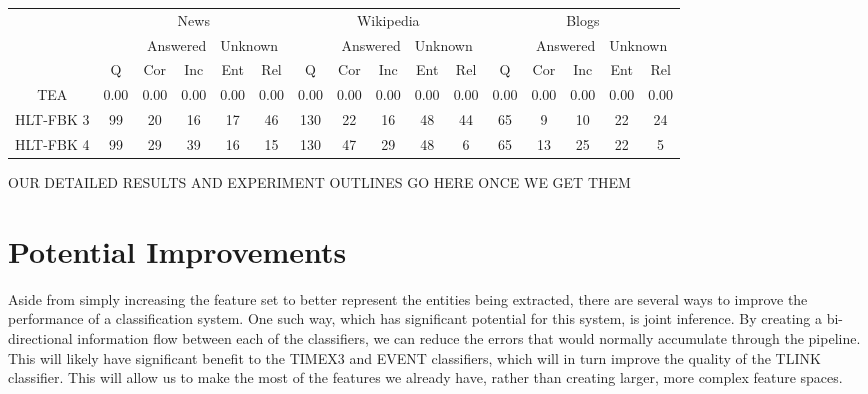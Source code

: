 \documentclass[11pt,letterpaper]{article}
\begin{document}
\begin{center}
	\begin{tabular}{c|ccc|cc|ccc|cc|ccc|cc}
		
	\multirow{2}{*}{} &
		\multicolumn{5}{c}{News} & 
		\multicolumn{5}{|c}{Wikipedia} & 
		\multicolumn{5}{|c}{Blogs} \\
	
	\multirow{2}{*}{} &
		\multicolumn{3}{r}{Answered} &
		\multicolumn{2}{l|}{Unknown} &
		\multicolumn{3}{r}{Answered} &
		\multicolumn{2}{l|}{Unknown} &
		\multicolumn{3}{r}{Answered} &
		\multicolumn{2}{l}{Unknown} \\
		
		& Q & Cor & Inc & Ent & Rel
		& Q & Cor & Inc & Ent & Rel
		& Q & Cor & Inc & Ent & Rel \\
		\hline
	
		TEA & 
		0.00 & 0.00 & 0.00 & 0.00 & 0.00 &
		0.00 & 0.00 & 0.00 & 0.00 & 0.00 & 
		0.00 & 0.00 & 0.00 & 0.00 & 0.00 \\

		HLT-FBK 3 &
		99 & 20 & 16 & 17 & 46 &
		130 & 22 & 16 & 48 & 44 &
		65 & 9 & 10 & 22 & 24 \\

		HLT-FBK 4 &
		99 & 29 & 39 & 16 & 15 &
		130 & 47 & 29 & 48 & 6 &
		65 & 13 & 25 & 22 & 5 \\
		
	\end{tabular}
\end{center}

\vspace{5mm}

OUR DETAILED RESULTS AND EXPERIMENT OUTLINES GO HERE ONCE WE GET THEM


\section{Potential Improvements}

Aside from simply increasing the feature set to better represent the entities being extracted, there are several ways to improve the performance of a classification system. One such way, which has significant potential for this system, is joint inference. By creating a bi-directional information flow between each of the classifiers, we can reduce the errors that would normally accumulate through the pipeline. This will likely have significant benefit to the TIMEX3 and EVENT classifiers, which will in turn improve the quality of the TLINK classifier. This will allow us to make the most of the features we already have, rather than creating larger, more complex feature spaces.
\end{document}
